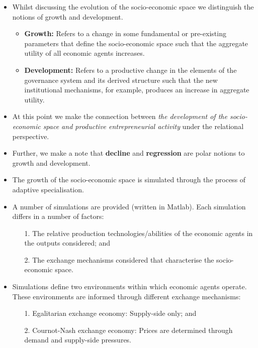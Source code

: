 \documentclass[10pt]{beamer}
\begin{document}
\begin{frame}
\begin{itemize}
\item Whilst discussing the evolution of the socio-economic space we distinguish the notions of growth and development.
\begin{itemize}
\medskip
\item \textbf{Growth:} Refers to a change in some fundamental or pre-existing parameters that define the socio-economic space such that the aggregate utility of all economic agents increases.
\medskip
\item \textbf{Development:} Refers to a productive change in the elements of the governance system and its derived structure such that the new institutional mechanisms, for example, produces an increase in aggregate utility.
\end{itemize}
\medskip
\item At this point we make the connection between \emph{the development of the socio-economic space and productive entrepreneurial activity} under the relational perspective.
\medskip
\item Further, we make a note that \textbf{decline} and \textbf{regression} are polar notions to growth and development.
\end{itemize}
\end{frame}


\begin{frame}
\begin{itemize}
\item The growth of the socio-economic space is simulated through the process of adaptive specialisation.
\medskip
\item A number of simulations are provided (written in Matlab). Each simulation differs in a number of factors:
\begin{itemize}
\medskip
\item[1.] The relative production technologies/abilities of the economic agents in the outputs considered; and
\medskip
\item[2.] The exchange mechanisms considered that characterise the socio-economic space.
\end{itemize}
\medskip
\item Simulations define two environments within which economic agents operate. These environments are informed through different exchange mechanisms:
\begin{itemize}
\medskip
\item[1.] Egalitarian exchange economy: Supply-side only; and
\medskip
\item[2.] Cournot-Nash exchange economy: Prices are determined through demand and supply-side pressures.
\end{itemize}
\end{itemize}
\end{frame}
\end{document}
